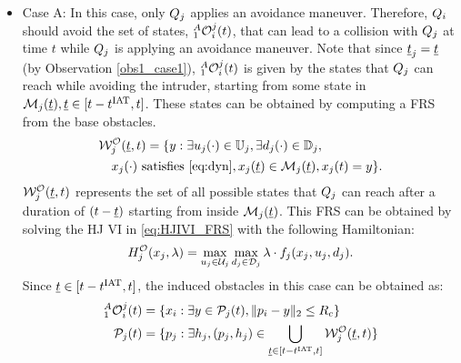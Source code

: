 \begin{itemize}[leftmargin=*] 
\item \label{sec:intruderObs_case1_caseA} Case A: In this case, only $Q_j$ applies an avoidance maneuver. Therefore, $Q_i$ should avoid the set of states, $_1^A\mathcal{O}_i^j(t)$, that can lead to a collision with $Q_j$ at time $t$ while $Q_j$ is applying an avoidance maneuver. Note that since $\underline{t}_j = \underline{t}$ (by Observation \ref{obs1_case1}), $_1^A\mathcal{O}_i^j(t)$ is given by the states that $Q_j$ can reach while avoiding the intruder, starting from some state in $\mathcal{M}_j(\underline{t}), \underline{t} \in [t-t^\text{IAT}, t]$. These states can be obtained by computing a FRS from the base obstacles.
\begin{equation} \label{eq:ObsFRS_case1_caseA}
\begin{aligned}
& \frs_{j}^{\mathcal{O}}(\tsa, t) = \{y: \exists \ctrl_j(\cdot) \in \cfset_j, \exists \dstb_j(\cdot) \in \dfset_j, \\
& \quad \state_j(\cdot) \text{ satisfies \eqref{eq:dyn}}, \state_j(\tsa) \in \boset_j(\tsa), \state_j(t) = y\}.
\end{aligned}
\end{equation}
$\mathcal{W}_{j}^{\mathcal{O}}(\underline{t}, t)$ represents the set of all possible states that $Q_j$ can reach after a duration of $(t-\underline{t})$ starting from inside $\mathcal{M}_j(\underline{t})$. This FRS can be obtained by solving the HJ VI in \eqref{eq:HJIVI_FRS} with the following Hamiltonian:
\begin{equation}
H_{j}^{\mathcal{O}}(x_j, \lambda) = \max_{u_j \in \mathcal{U}_j} \max_{d_j \in \mathcal{D}_j} \lambda \cdot f_j (x_j, u_j, d_j).
\end{equation} 
Since $\underline{t} \in [t-t^\text{IAT}, t]$, the induced obstacles in this case can be obtained as:
\begin{equation} \label{eq:intruderObs_case1_caseA} 
\begin{aligned}
_1^A\ioset_i^j(t) & = \{\state_i: \exists y \in \pfrs_j(t), \|\pos_i - y\|_2 \le \rc \}\\
\pfrs_j(t) & = \{p_j: \exists \npos_j, (p_j, \npos_j) \in \bigcup_{\tsa \in [t-\iat, t]} \frs_{j}^{\mathcal{O}}(\tsa, t) \}
\end{aligned}
\end{equation}


\end{itemize}
